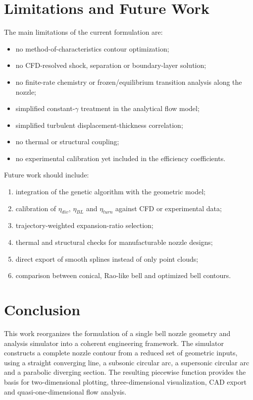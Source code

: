 \documentclass[11pt,a4paper]{article}
\begin{document}
\section{Limitations and Future Work}

The main limitations of the current formulation are:
\begin{itemize}
    \item no method-of-characteristics contour optimization;
    \item no CFD-resolved shock, separation or boundary-layer solution;
    \item no finite-rate chemistry or frozen/equilibrium transition analysis along the nozzle;
    \item simplified constant-$\gamma$ treatment in the analytical flow model;
    \item simplified turbulent displacement-thickness correlation;
    \item no thermal or structural coupling;
    \item no experimental calibration yet included in the efficiency coefficients.
\end{itemize}

Future work should include:
\begin{enumerate}
    \item integration of the genetic algorithm with the geometric model;
    \item calibration of $\eta_{div}$, $\eta_{BL}$ and $\eta_{turn}$ against CFD or experimental data;
    \item trajectory-weighted expansion-ratio selection;
    \item thermal and structural checks for manufacturable nozzle designs;
    \item direct export of smooth splines instead of only point clouds;
    \item comparison between conical, Rao-like bell and optimized bell contours.
\end{enumerate}

\section{Conclusion}

This work reorganizes the formulation of a single bell nozzle geometry and analysis simulator into a coherent engineering framework. The simulator constructs a complete nozzle contour from a reduced set of geometric inputs, using a straight converging line, a subsonic circular arc, a supersonic circular arc and a parabolic diverging section. The resulting piecewise function provides the basis for two-dimensional plotting, three-dimensional visualization, CAD export and quasi-one-dimensional flow analysis.
\end{document}
